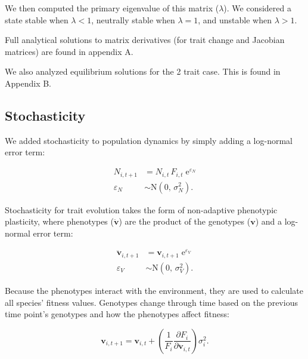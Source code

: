 \noindent We then computed the primary eigenvalue of this matrix ($\lambda$).
We considered a state stable when $\lambda < 1$,
neutrally stable when $\lambda = 1$,
and unstable when $\lambda > 1$.

Full analytical solutions to matrix derivatives (for trait change and
Jacobian matrices) are found in appendix A.

We also analyzed equilibrium solutions for the 2 trait case.
This is found in Appendix B.


\subsection*{Stochasticity}

We added stochasticity to population dynamics by simply adding 
a log-normal error term:

\begin{equation} \label{eq:N-stochasticity}
\begin{split}
    N_{i,t+1} &= N_{i,t} \, F_{i,t} \; \text{e}^{\varepsilon_N} \\
    \varepsilon_N &\sim \text{N}(0, \, \sigma^2_N)
    \text{.}
\end{split}
\end{equation}


Stochasticity for trait evolution takes the form of non-adaptive
phenotypic plasticity,
where phenotypes ($\mathbf{\ddot{v}}$) are the product of the
genotypes ($\mathbf{v}$) and a log-normal error term:

\begin{equation} \label{eq:V-stochasticity}
\begin{split}
    \mathbf{\ddot{v}}_{i,t+1} &= \mathbf{v}_{i,t+1} \; \text{e}^{\varepsilon_V} \\
    \varepsilon_V &\sim \text{N}(0, \, \sigma^2_V)
    \text{.}
\end{split}
\end{equation}

Because the phenotypes interact with the environment, they are used
to calculate all species' fitness values.
Genotypes change through time based on the previous time point's 
genotypes and how the phenotypes affect fitness:

\begin{equation} \label{eq:trait-change-stochastic}
    \mathbf{v}_{i,t+1} = \mathbf{v}_{i,t} + \left( \frac{1}{F_i}
        \frac{\partial F_i}{\partial \mathbf{\ddot{v}}_{i,t}} \right) \sigma^2_i
    \textrm{.}
\end{equation}





